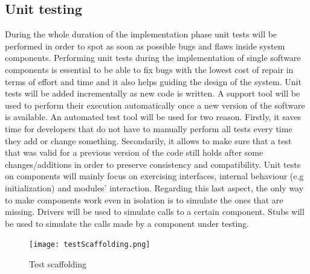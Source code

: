 \documentclass[titlepage]{article}
\begin{document}
\subsection{Unit testing}
During the whole duration of the implementation phase unit tests will be performed in order to spot as soon as possible bugs and flaws inside system components. Performing unit tests during the implementation of single software components is essential to be able to fix bugs with the lowest cost of repair in terms of effort and time and it also helps guiding the design of the system.
Unit tests will be added incrementally as new code is written. A support tool will be used to perform their execution automatically once a new version of the software is available. An automated test tool will be used for two reason. Firstly, it saves time for developers that do not have to manually perform all tests every time they add or change something. Secondarily, it allows to make sure that a test that was valid for a previous version of the code still holds after some changes/additions in order to preserve consistency and compatibility.
Unit tests on components will mainly focus on exercising interfaces, internal behaviour (e.g initialization) and modules’ interaction. Regarding this last aspect, the only way to make components work even in isolation is to simulate the ones that are missing. Drivers will be used to simulate calls to a certain component. Stubs will be used to simulate the calls made by a component under testing.
\begin{figure}[H]
	\center
  	\texttt{[image: testScaffolding.png]}
  	\caption{Test scaffolding}
 	\label{fig:testScaffoling}
\end{figure}
\end{document}
